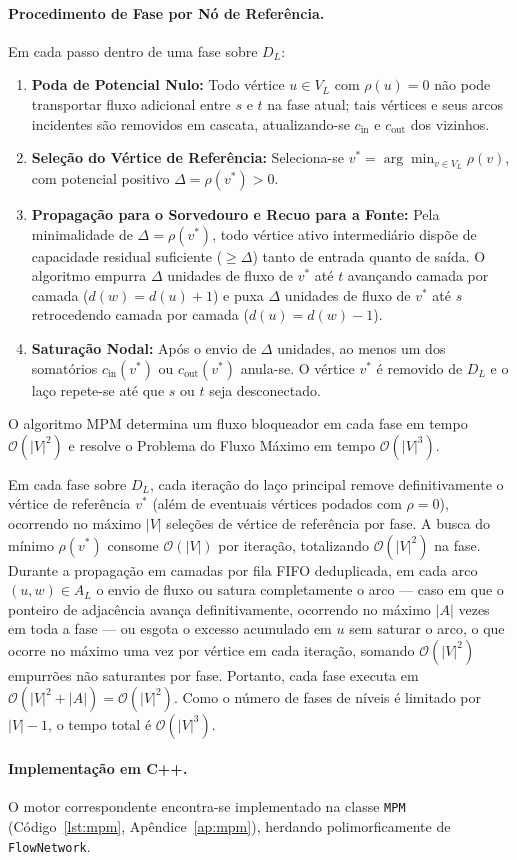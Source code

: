 \paragraph{Procedimento de Fase por Nó de Referência.}
Em cada passo dentro de uma fase sobre $D_L$:
\begin{enumerate}
    \item \textbf{Poda de Potencial Nulo:} Todo vértice $u \in V_L$ com $\rho(u) = 0$ não pode transportar fluxo adicional entre $s$ e $t$ na fase atual; tais vértices e seus arcos incidentes são removidos em cascata, atualizando-se $c_{\text{in}}$ e $c_{\text{out}}$ dos vizinhos.
    \item \textbf{Seleção do Vértice de Referência:} Seleciona-se $v^* = \arg\min_{v \in V_L} \rho(v)$, com potencial positivo $\Delta = \rho(v^*) > 0$.
    \item \textbf{Propagação para o Sorvedouro e Recuo para a Fonte:} Pela minimalidade de $\Delta = \rho(v^*)$, todo vértice ativo intermediário dispõe de capacidade residual suficiente ($\ge \Delta$) tanto de entrada quanto de saída. O algoritmo empurra $\Delta$ unidades de fluxo de $v^*$ até $t$ avançando camada por camada ($d(w) = d(u) + 1$) e puxa $\Delta$ unidades de fluxo de $v^*$ até $s$ retrocedendo camada por camada ($d(u) = d(w) - 1$).
    \item \textbf{Saturação Nodal:} Após o envio de $\Delta$ unidades, ao menos um dos somatórios $c_{\text{in}}(v^*)$ ou $c_{\text{out}}(v^*)$ anula-se. O vértice $v^*$ é removido de $D_L$ e o laço repete-se até que $s$ ou $t$ seja desconectado.
\end{enumerate}

\begin{teorema}
O algoritmo MPM determina um fluxo bloqueador em cada fase em tempo $\mathcal{O}(|V|^2)$ e resolve o Problema do Fluxo Máximo em tempo $\mathcal{O}(|V|^3)$.
\end{teorema}

\begin{demonstracao}
Em cada fase sobre $D_L$, cada iteração do laço principal remove definitivamente o vértice de referência $v^*$ (além de eventuais vértices podados com $\rho = 0$), ocorrendo no máximo $|V|$ seleções de vértice de referência por fase. A busca do mínimo $\rho(v^*)$ consome $\mathcal{O}(|V|)$ por iteração, totalizando $\mathcal{O}(|V|^2)$ na fase. Durante a propagação em camadas por fila FIFO deduplicada, em cada arco $(u, w) \in A_L$ o envio de fluxo ou satura completamente o arco — caso em que o ponteiro de adjacência avança definitivamente, ocorrendo no máximo $|A|$ vezes em toda a fase — ou esgota o excesso acumulado em $u$ sem saturar o arco, o que ocorre no máximo uma vez por vértice em cada iteração, somando $\mathcal{O}(|V|^2)$ empurrões não saturantes por fase. Portanto, cada fase executa em $\mathcal{O}(|V|^2 + |A|) = \mathcal{O}(|V|^2)$. Como o número de fases de níveis é limitado por $|V| - 1$, o tempo total é $\mathcal{O}(|V|^3)$.
\end{demonstracao}

\paragraph{Implementação em C++.}
O motor correspondente encontra-se implementado na classe \lstinline{MPM} (Código~\ref{lst:mpm}, Apêndice~\ref{ap:mpm}), herdando polimorficamente de \lstinline{FlowNetwork}.
